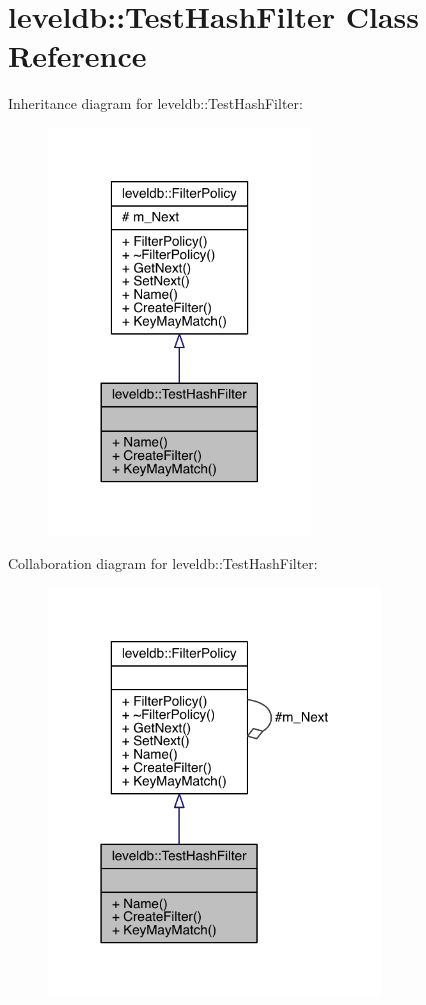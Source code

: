 \hypertarget{classleveldb_1_1_test_hash_filter}{}\section{leveldb\+:\+:Test\+Hash\+Filter Class Reference}
\label{classleveldb_1_1_test_hash_filter}


Inheritance diagram for leveldb\+:\+:Test\+Hash\+Filter\+:\nopagebreak
\begin{figure}[H]
\begin{center}
\leavevmode
\includegraphics[width=197pt]{classleveldb_1_1_test_hash_filter__inherit__graph}
\end{center}
\end{figure}


Collaboration diagram for leveldb\+:\+:Test\+Hash\+Filter\+:\nopagebreak
\begin{figure}[H]
\begin{center}
\leavevmode
\includegraphics[width=250pt]{classleveldb_1_1_test_hash_filter__coll__graph}
\end{center}
\end{figure}
